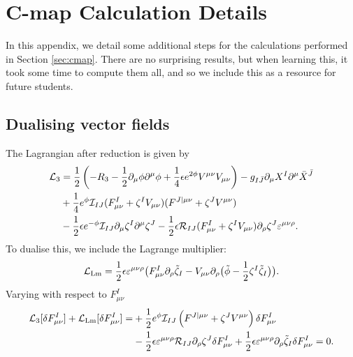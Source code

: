 \chapter{C-map Calculation Details}
\label{app:cmapfurther}

In this appendix, we detail some additional steps for the calculations performed in Section \ref{sec:cmap}. There are no surprising results, but when learning this, it took some time to compute them all, and so we include this as a resource for future students. 

\section{Dualising vector fields}

The Lagrangian after reduction is given by
\begin{equation}
\begin{aligned}
 {\cal L}_3 &= \frac{1}{2}\left(-R_3 - \frac{1}{2}\partial_\mu \phi \partial^\mu \phi + \frac{1}{4}\epsilon e^{2\phi}V^{\mu\nu} V_{\mu\nu} \right) - g_{I\bar{J}} \partial_\mu X^I \partial^\mu \bar{X}^{\bar{J}} \\
 &+ \frac{1}{4}e^\phi {\cal I}_{IJ}(F^I_{\mu\nu} + \zeta^IV_{\mu\nu})(F^{J|\mu\nu} + \zeta^JV^{\mu\nu}) \\
 &- \frac{1}{2}\epsilon e^{-\phi} {\cal I}_{IJ} \partial_\mu\zeta^I \partial^\mu \zeta^J - \frac{1}{2} \epsilon {\cal R}_{IJ}(F^I_{\mu\nu} + \zeta^IV_{\mu\nu})\partial_\rho\zeta^J {\varepsilon}^{\mu\nu\rho}.
\end{aligned}
\end{equation}
To dualise this, we include the Lagrange multiplier: 
\begin{equation}
{\cal L}_{\text{Lm}} = \frac{1}{2} \epsilon \varepsilon^{\mu\nu\rho} \big(F^I_{\mu\nu}\partial_\rho\tilde{\zeta}_I - V_{\mu\nu}
\partial_\rho \big(\tilde{\phi} - \frac{1}{2} \zeta^I\tilde{\zeta}_I \big)\big).
\end{equation}
Varying with respect to $F^I_{\mu \nu}$
\begin{equation*}
	\begin{aligned}
		{\cal L}_3[\delta F^I_{\mu \nu}] + {\cal L}_{\text{Lm}}[\delta F^I_{\mu \nu}] = &+ \frac{1}{2} e^{\phi} {\cal I}_{IJ} \left(F^{J |\mu \nu} + \zeta^J V^{\mu \nu} \right) \delta F^I_{\mu \nu} \\
		&- \frac{1}{2} \epsilon \varepsilon^{\mu\nu\rho} {\cal R}_{IJ} \partial_\rho \zeta^J \delta F^I_{\mu \nu} 
		+ \frac{1}{2} \epsilon \varepsilon^{\mu\nu\rho} \partial_\rho \tilde{\zeta}_I \delta F^I_{\mu \nu} = 0.
	\end{aligned}
\end{equation*}
